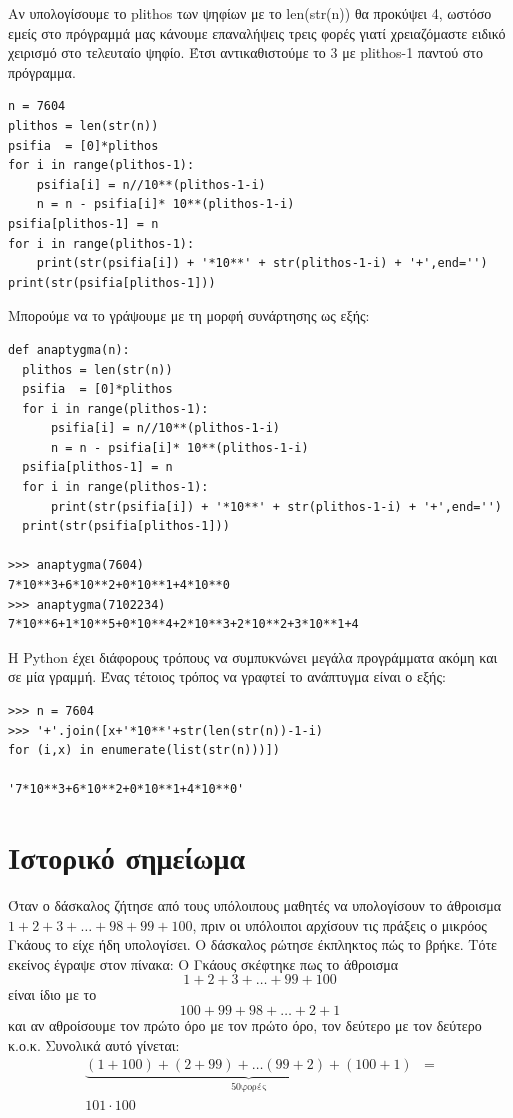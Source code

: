\documentclass[b5paper,11pt,twoside,openleft]{memoir}
\begin{document}
Αν υπολογίσουμε το plithos των ψηφίων με το len(str(n)) θα προκύψει 4, ωστόσο εμείς στο πρόγραμμά μας κάνουμε επαναλήψεις τρεις φορές γιατί χρειαζόμαστε ειδικό χειρισμό στο τελευταίο ψηφίο. Έτσι αντικαθιστούμε το 3 με plithos-1 παντού στο πρόγραμμα.
\begin{lstlisting}
n = 7604
plithos = len(str(n))
psifia  = [0]*plithos
for i in range(plithos-1):
    psifia[i] = n//10**(plithos-1-i)
    n = n - psifia[i]* 10**(plithos-1-i)
psifia[plithos-1] = n
for i in range(plithos-1):
    print(str(psifia[i]) + '*10**' + str(plithos-1-i) + '+',end='')
print(str(psifia[plithos-1]))
\end{lstlisting}

Μπορούμε να το γράψουμε με τη μορφή συνάρτησης ως εξής:
\begin{lstlisting}
def anaptygma(n):
  plithos = len(str(n))
  psifia  = [0]*plithos
  for i in range(plithos-1):
      psifia[i] = n//10**(plithos-1-i)
      n = n - psifia[i]* 10**(plithos-1-i)
  psifia[plithos-1] = n
  for i in range(plithos-1):
      print(str(psifia[i]) + '*10**' + str(plithos-1-i) + '+',end='')
  print(str(psifia[plithos-1]))

>>> anaptygma(7604)
7*10**3+6*10**2+0*10**1+4*10**0
>>> anaptygma(7102234)
7*10**6+1*10**5+0*10**4+2*10**3+2*10**2+3*10**1+4
\end{lstlisting}
Η Python έχει διάφορους τρόπους να συμπυκνώνει μεγάλα προγράμματα ακόμη και σε μία γραμμή. Ένας τέτοιος τρόπος να γραφτεί το ανάπτυγμα είναι ο εξής:
\begin{lstlisting}
>>> n = 7604
>>> '+'.join([x+'*10**'+str(len(str(n))-1-i) 
for (i,x) in enumerate(list(str(n)))])

'7*10**3+6*10**2+0*10**1+4*10**0'
\end{lstlisting}

\section{Ιστορικό σημείωμα}

Όταν ο δάσκαλος ζήτησε από τους υπόλοιπους μαθητές να υπολογίσουν το άθροισμα $1+2+3+\ldots+98+99+100$, πριν οι υπόλοιποι αρχίσουν τις πράξεις ο μικρόος Γκάους το είχε ήδη υπολογίσει. Ο δάσκαλος ρώτησε έκπληκτος πώς το βρήκε. Τότε εκείνος έγραψε στον πίνακα:
O Γκάους σκέφτηκε πως το άθροισμα 
$$
1    +    2 + 3  + \ldots + 99 + 100
$$
είναι ίδιο με το
$$
100+  99+ 98+ \ldots +    2  + 1
$$
και αν αθροίσουμε τον πρώτο όρο με τον πρώτο όρο, τον δεύτερο με τον δεύτερο κ.ο.κ. Συνολικά αυτό γίνεται:
\begin{eqnarray}
\underbrace{(1+100) + (2+99) + \ldots  (99+2)+(100+1) }_{50 \text{φορές}} &=\\
101\cdot 100&\\
\end{eqnarray}
\end{document}
